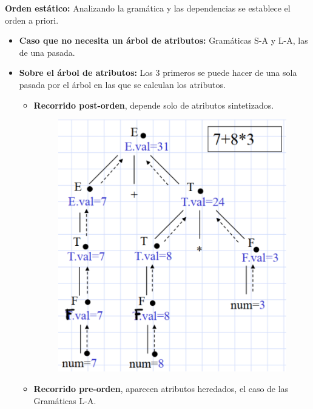 \documentclass[12pt, twoside, openright]{report} %
\begin{document}
\textbf{Orden estático:} Analizando la gramática y las dependencias se establece el orden a priori.
  \begin{itemize}
    \item \textbf{Caso que no necesita un árbol de atributos:} Gramáticas S-A y L-A, las de una pasada.
    \item \textbf{Sobre el árbol de atributos:} Los 3 primeros se puede hacer de una sola pasada por el árbol en las que se calculan los atributos.
    \begin{itemize}
      \item \textbf{Recorrido post-orden}, depende solo de atributos sintetizados.
      \begin{figure}[H]
        {\includegraphics[scale=.25]{2021-05-01 01_50_04-05_resum_Sem_2021.pdf - Foxit Reader.png}}
      \end{figure}
      \item \textbf{Recorrido pre-orden}, aparecen atributos heredados, el caso de las Gramáticas L-A.
      \begin{figure}[H]

\end{figure}
\end{itemize}
\end{itemize}
\end{document}

